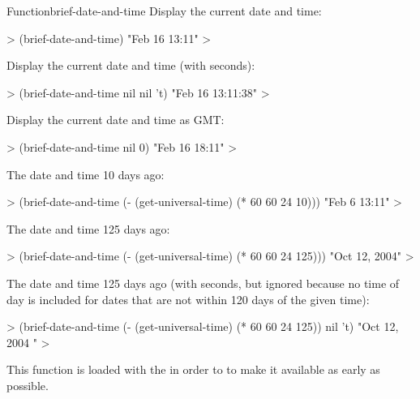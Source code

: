 \documentclass[10pt,twoside,english,pdftex]{article}
\begin{document}
\begin{functiondoc}{Function}{brief-date-and-time}{%
     
     
    \returns{} }
\fnexamples
Display the current date and time: 
%
\W\supp
\begin{example}
  > (brief-date-and-time)
  "Feb 16 13:11"
  >
\end{example}
%
Display the current date and time (with seconds):
%
\W\supp\notpretop
\begin{example}
  > (brief-date-and-time nil nil 't)
  "Feb 16 13:11:38"
  >
\end{example}
%
Display the current date and time as GMT: 
%
\W\supp\notpretop
\begin{example}
  > (brief-date-and-time nil 0)
  "Feb 16 18:11"
  >
\end{example}
%
The date and time 10 days ago:
%
\W\supp\notpretop
\begin{example}
  > (brief-date-and-time (- (get-universal-time) (* 60 60 24 10)))
  "Feb  6 13:11"
  >
\end{example}
%
The date and time 125 days ago:
%
\W\supp\notpretop
\begin{example}
  > (brief-date-and-time (- (get-universal-time) (* 60 60 24 125)))
  "Oct 12, 2004"
  >
\end{example}
%
The date and time 125 days ago (with seconds, but ignored because no time of
day is included for dates that are not within 120 days of the given time):
%
\W\supp\notpretop
\begin{example}
  > (brief-date-and-time (- (get-universal-time) (* 60 60 24 125)) nil 't)
  "Oct 12, 2004   "
  >
\end{example}

\fnnote
{}%
%
%
This function is loaded with the  
in order to to make it available as early as possible.

\end{functiondoc}

\end{document}
